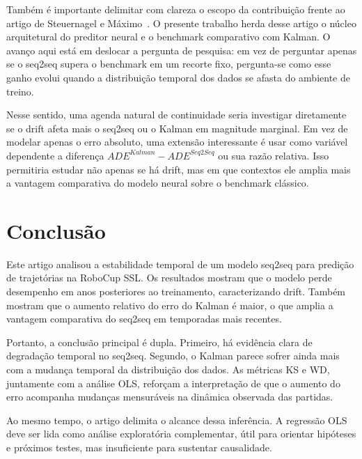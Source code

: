 \documentclass[runningheads]{llncs}
\begin{document}
Tamb\'em \'e importante delimitar com clareza o escopo da contribui\c{c}\~ao frente ao artigo de Steuernagel e M\'aximo~\cite{seq2seq}. O presente trabalho herda desse artigo o n\'ucleo arquitetural do preditor neural e o benchmark comparativo com Kalman. O avan\c{c}o aqui est\'a em deslocar a pergunta de pesquisa: em vez de perguntar apenas se o seq2seq supera o benchmark em um recorte fixo, pergunta-se como esse ganho evolui quando a distribui\c{c}\~ao temporal dos dados se afasta do ambiente de treino.

Nesse sentido, uma agenda natural de continuidade seria investigar diretamente se o drift afeta mais o seq2seq ou o Kalman em magnitude marginal. Em vez de modelar apenas o erro absoluto, uma extens\~ao interessante \'e usar como vari\'avel dependente a diferen\c{c}a \(ADE^{Kalman} - ADE^{Seq2Seq}\) ou sua raz\~ao relativa. Isso permitiria estudar n\~ao apenas se h\'a drift, mas em que contextos ele amplia mais a vantagem comparativa do modelo neural sobre o benchmark cl\'assico.

\section{Conclus\~ao}

Este artigo analisou a estabilidade temporal de um modelo seq2seq para predi\c{c}\~ao de trajet\'orias na RoboCup SSL. Os resultados mostram que o modelo perde desempenho em anos posteriores ao treinamento, caracterizando drift. Tamb\'em mostram que o aumento relativo do erro do Kalman \'e maior, o que amplia a vantagem comparativa do seq2seq em temporadas mais recentes.

Portanto, a conclus\~ao principal \'e dupla. Primeiro, h\'a evid\^encia clara de degrada\c{c}\~ao temporal no seq2seq. Segundo, o Kalman parece sofrer ainda mais com a mudan\c{c}a temporal da distribui\c{c}\~ao dos dados. As m\'etricas KS e WD, juntamente com a an\'alise OLS, refor\c{c}am a interpreta\c{c}\~ao de que o aumento do erro acompanha mudan\c{c}as mensur\'aveis na din\^amica observada das partidas.

Ao mesmo tempo, o artigo delimita o alcance dessa infer\^encia. A regress\~ao OLS deve ser lida como an\'alise explorat\'oria complementar, \'util para orientar hip\'oteses e pr\'oximos testes, mas insuficiente para sustentar causalidade.
\end{document}
